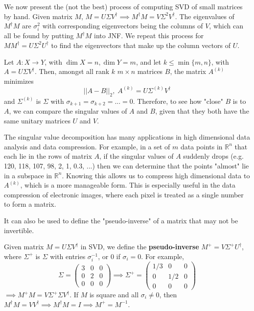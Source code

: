   We now present the (not the best) process of computing SVD of small matrices by hand. Given matrix $M$, $M = U \Sigma V^\dagger \implies M^\dagger M = V \Sigma^2 V^\dagger$. The eigenvalues of $M^\dagger M$ are $\sigma_i^2$ with corresponding eigenvectors being the columns of $V$, which can all be found by putting $M^\dagger M$ into JNF. We repeat this process for $M M^\dagger = U \Sigma^2 U^\dagger$ to find the eigenvectors that make up the column vectors of $U$. 

  \begin{theorem}
  Let $A: X \longrightarrow Y$, with $\dim{X} = n, \dim{Y} = m$, and let $k \leq \min{\{m, n\}}$, with $A = U \Sigma V^\dagger$. Then, amongst all rank $k$ $m \times n$ matrices $B$, the matrix $A^{(k)}$ minimizes 
  \[||A-B||_2, \; A^{(k)} = U \Sigma^{(k)} V^\dagger\]
  and $\Sigma^{(k)}$ is $\Sigma$ with $\sigma_{k+1} = \sigma_{k+2} = ... = 0$. Therefore, to see how "close" $B$ is to $A$, we can compare the singular values of $A$ and $B$, given that they both have the same unitary matrices $U$ and $V$. 
  \end{theorem}

  The singular value decomposition has many applications in high dimensional data analysis and data compression. For example, in a set of $m$ data points in $\mathbb{R}^n$ that each lie in the rows of matrix $A$, if the singular values of $A$ suddenly drops (e.g. 120, 118, 107, 98, 2, 1, 0.3, ...) then we can determine that the points "almost" lie in a subspace in $\mathbb{R}^n$. Knowing this allows us to compress high dimensional data to $A^{(k)}$, which is a more manageable form. This is especially useful in the data compression of electronic images, where each pixel is treated as a single number to form a matrix. 

  It can also be used to define the "pseudo-inverse" of a matrix that may not be invertible. 

  \begin{definition}
  Given matrix $M = U \Sigma V^\dagger$ in SVD, we define the \textbf{pseudo-inverse} $M^+ = V \Sigma^+ U^\dagger$, where $\Sigma^+$ is $\Sigma$ with entries $\sigma_i^{-1}$, or $0$ if $\sigma_i = 0$. For example,
  \[ \Sigma = \begin{pmatrix}3&0&0\\0&2&0\\0&0&0\end{pmatrix} \implies \Sigma^+ = \begin{pmatrix}1/3&0&0\\0&1/2&0\\0&0&0\end{pmatrix}\]
  $\implies M^+ M = V \Sigma^+ \Sigma V^\dagger$. If $M$ is square and all $\sigma_i \neq 0$, then $M^\dagger M = V V^\dagger \implies M^\dagger M = I \implies  M^+ = M^{-1}$. 
  \end{definition}

